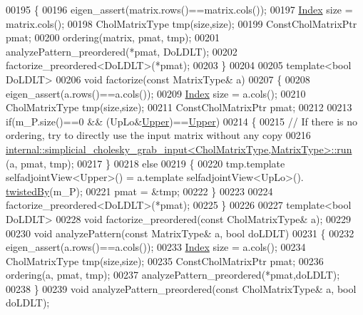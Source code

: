 \begin{DoxyCode}
00195     \{
00196       eigen\_assert(matrix.rows()==matrix.cols());
00197       \hyperlink{namespace_eigen_a62e77e0933482dafde8fe197d9a2cfde}{Index} size = matrix.cols();
00198       CholMatrixType tmp(size,size);
00199       ConstCholMatrixPtr pmat;
00200       ordering(matrix, pmat, tmp);
00201       analyzePattern\_preordered(*pmat, DoLDLT);
00202       factorize\_preordered<DoLDLT>(*pmat);
00203     \}
00204     
00205     \textcolor{keyword}{template}<\textcolor{keywordtype}{bool} DoLDLT>
00206     \textcolor{keywordtype}{void} factorize(\textcolor{keyword}{const} MatrixType& a)
00207     \{
00208       eigen\_assert(a.rows()==a.cols());
00209       \hyperlink{namespace_eigen_a62e77e0933482dafde8fe197d9a2cfde}{Index} size = a.cols();
00210       CholMatrixType tmp(size,size);
00211       ConstCholMatrixPtr pmat;
00212       
00213       \textcolor{keywordflow}{if}(m\_P.size()==0 && (UpLo&\hyperlink{group__enums_gga39e3366ff5554d731e7dc8bb642f83cda6bcb58be3b8b8ec84859ce0c5ac0aaec}{Upper})==\hyperlink{group__enums_gga39e3366ff5554d731e7dc8bb642f83cda6bcb58be3b8b8ec84859ce0c5ac0aaec}{Upper})
00214       \{
00215         \textcolor{comment}{// If there is no ordering, try to directly use the input matrix without any copy}
00216         \hyperlink{struct_eigen_1_1internal_1_1simplicial__cholesky__grab__input}{internal::simplicial\_cholesky\_grab\_input<CholMatrixType,MatrixType>::run}
      (a, pmat, tmp);
00217       \}
00218       \textcolor{keywordflow}{else}
00219       \{
00220         tmp.template selfadjointView<Upper>() = a.template selfadjointView<UpLo>().
      \hyperlink{group___sparse_core___module_a51d4898bd6a57cc3ba543a39b102423e}{twistedBy}(m\_P);
00221         pmat = &tmp;
00222       \}
00223       
00224       factorize\_preordered<DoLDLT>(*pmat);
00225     \}
00226 
00227     \textcolor{keyword}{template}<\textcolor{keywordtype}{bool} DoLDLT>
00228     \textcolor{keywordtype}{void} factorize\_preordered(\textcolor{keyword}{const} CholMatrixType& a);
00229 
00230     \textcolor{keywordtype}{void} analyzePattern(\textcolor{keyword}{const} MatrixType& a, \textcolor{keywordtype}{bool} doLDLT)
00231     \{
00232       eigen\_assert(a.rows()==a.cols());
00233       \hyperlink{namespace_eigen_a62e77e0933482dafde8fe197d9a2cfde}{Index} size = a.cols();
00234       CholMatrixType tmp(size,size);
00235       ConstCholMatrixPtr pmat;
00236       ordering(a, pmat, tmp);
00237       analyzePattern\_preordered(*pmat,doLDLT);
00238     \}
00239     \textcolor{keywordtype}{void} analyzePattern\_preordered(\textcolor{keyword}{const} CholMatrixType& a, \textcolor{keywordtype}{bool} doLDLT);

\end{DoxyCode}
